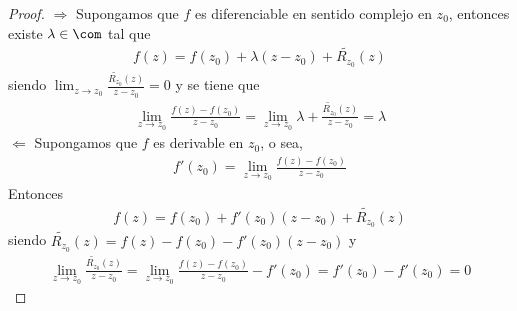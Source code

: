 \begin{proof}
$\Longrightarrow$ Supongamos que $f$ es diferenciable en sentido complejo en $z_0$, entonces existe $\lambda \in \com$ tal que
\begin{align*}
    f(z) = f(z_0) + \lambda (z - z_0) + \widetilde{R_{z_0}}(z)
\end{align*}
siendo $\lim_{z \to z_0}{\frac{\widetilde{R_{z_0}}(z)}{z - z_0} = 0}$ y se tiene que
\begin{align*}
    \lim_{z \to z_0}{\frac{f(z) - f(z_0)}{z -z_0}} = \lim_{z \to z_0}{\lambda + \frac{\widetilde{R_{z_0}}(z)}{z - z_0}} = \lambda
\end{align*}
$\Longleftarrow$ Supongamos que $f$ es derivable en $z_0$, o sea,
\begin{align*}
    f'(z_0) = \lim_{z \to z_0}{\frac{f(z) - f(z_0)}{z -z_0}}
\end{align*}
Entonces
\begin{align*}
    f(z) = f(z_0) + f'(z_0)(z - z_0) + \widetilde{R_{z_0}}(z)
\end{align*}
siendo $\widetilde{R_{z_0}}(z) =  f(z) - f(z_0) - f'(z_0)(z - z_0)$ y
\begin{align*}
    \lim_{z \to z_0}{\frac{\widetilde{R_{z_0}}(z)}{z -z_0}} = \lim_{z \to z_0}{\frac{f(z) - f(z_0)}{z - z_0}} - f'(z_0) = f'(z_0) - f'(z_0) = 0
\end{align*}
\end{proof}

